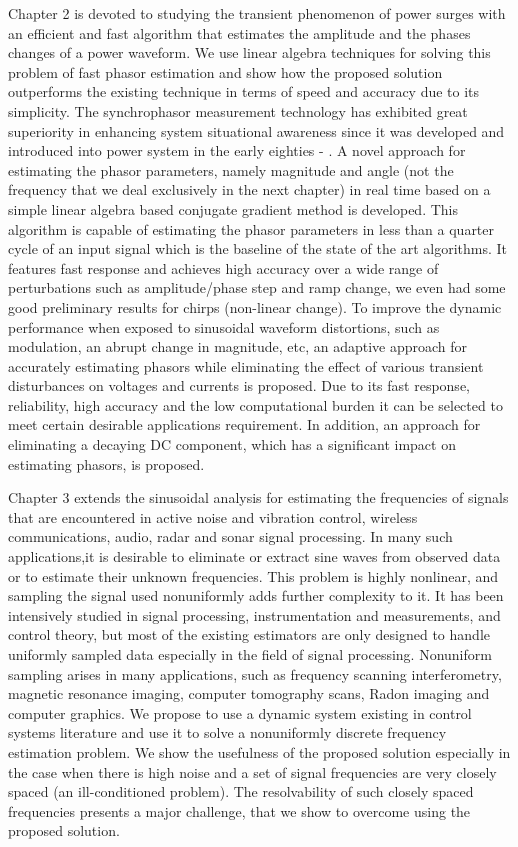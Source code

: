 \documentclass{UCF_ETD}
\begin{document}
Chapter 2 is devoted to studying the transient phenomenon of power surges with an efficient and fast algorithm that estimates the amplitude and the phases changes of a power waveform. We use linear algebra techniques for solving this problem of fast phasor estimation and show how the proposed solution outperforms the existing technique in terms of speed and accuracy due to its simplicity. The synchrophasor measurement technology has exhibited great superiority in enhancing system situational awareness since it was developed and introduced into power system in the early eighties \cite{Bonanomi1981} - \cite{Burnett1994}. A novel approach for estimating the phasor parameters, namely  magnitude and angle (not the frequency that we deal exclusively in the next chapter) in real time based on a simple linear algebra based conjugate gradient method is developed. This algorithm is capable of estimating the phasor parameters in less than a quarter cycle of an input signal which is the baseline of the state of the art algorithms. It features fast response and achieves high accuracy over a wide range of perturbations such as amplitude/phase step and ramp change, we even had some good preliminary results for chirps (non-linear change). To improve the dynamic performance when exposed to sinusoidal waveform distortions, such as modulation, an abrupt change in magnitude, etc, an adaptive approach for accurately estimating phasors while eliminating the effect of various transient disturbances on voltages and currents is proposed. Due to its fast response, reliability, high accuracy and the low computational burden it can be selected to meet certain desirable applications requirement. In addition, an approach for eliminating a decaying DC component, which has a significant impact on estimating phasors, is proposed. 

Chapter 3 extends the sinusoidal analysis for estimating the frequencies of signals that are encountered in active noise and vibration control, wireless communications, audio, radar and sonar
signal processing. In many such applications,it is desirable to 
eliminate or extract sine waves from observed data or to estimate
their unknown frequencies. This problem is highly nonlinear, and sampling the signal used nonuniformly adds further complexity to it. It has been intensively studied in signal processing, instrumentation and measurements, and control theory, but most of the existing estimators are only designed to handle uniformly sampled data especially in the field of signal processing. Nonuniform sampling arises in many applications, such as frequency scanning interferometry, magnetic resonance imaging, computer tomography scans, Radon imaging and computer graphics. We propose to use a dynamic system existing in control systems literature and use it to solve a nonuniformly discrete frequency estimation problem. We show the usefulness of the proposed solution especially in the case when there is high noise and a set of signal frequencies are very closely spaced (an ill-conditioned problem). The resolvability of such closely spaced frequencies presents a major challenge, that we show to overcome using the proposed solution.
\end{document}
